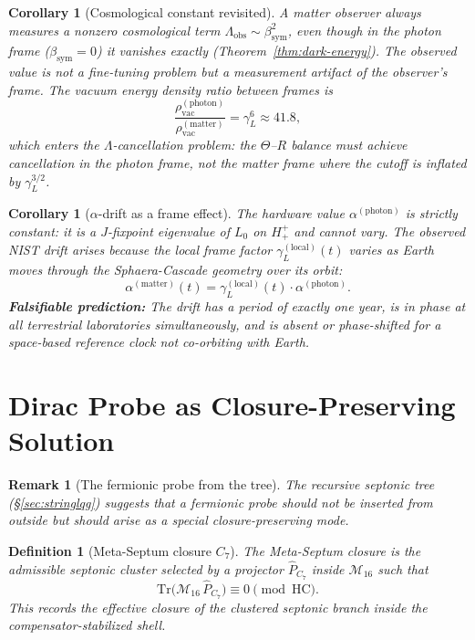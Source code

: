 \documentclass[12pt,a4paper]{article}
\newtheorem{corollary}[theorem]{Corollary}
\newtheorem{definition}[theorem]{Definition}
\newtheorem*{remark}{Remark}
\newcommand{\bsym}{\beta_{\mathrm{sym}}}
\newcommand{\gL}{\gamma_L}
\newcommand{\Hplusplus}{H^+_+}
\begin{document}
\begin{corollary}[Cosmological constant revisited]
A matter observer always measures a nonzero cosmological term
$\Lambda_{\mathrm{obs}}\sim\bsym^2$, even though in the photon frame
($\bsym=0$) it vanishes exactly
(Theorem~\ref{thm:dark-energy}).
The observed value is not a fine-tuning problem but a measurement
artifact of the observer's frame.
The vacuum energy density ratio between frames is
\[
  \frac{\rho_{\mathrm{vac}}^{(\mathrm{photon})}}
       {\rho_{\mathrm{vac}}^{(\mathrm{matter})}}
  = \gL^6\approx 41.8,
\]
which enters the $\Lambda$-cancellation problem: the $\Theta$--$R$
balance must achieve cancellation in the \emph{photon} frame, not the
matter frame where the cutoff is inflated by $\gL^{3/2}$.
\end{corollary}

\begin{corollary}[$\alpha$-drift as a frame effect]
The hardware value $\alpha^{(\mathrm{photon})}$ is strictly constant:
it is a $J$-fixpoint eigenvalue of $L_0$ on $\Hplusplus$ and cannot vary.
The observed NIST drift arises because the local frame factor
$\gL^{(\mathrm{local})}(t)$ varies as Earth moves through the
Sphaera-Cascade geometry over its orbit:
\[
  \alpha^{(\mathrm{matter})}(t)
  = \gL^{(\mathrm{local})}(t)\cdot\alpha^{(\mathrm{photon})}.
\]
\textbf{Falsifiable prediction:} The drift has a period of exactly one
year, is in phase at all terrestrial laboratories simultaneously, and is
absent or phase-shifted for a space-based reference clock not co-orbiting
with Earth.
\end{corollary}


\section{Dirac Probe as Closure-Preserving Solution}
\label{sec:dirac-probe}

\begin{remark}[The fermionic probe from the tree]
The recursive septonic tree (§\ref{sec:stringlqg}) suggests that
a fermionic probe should not be inserted from outside but should arise
as a special closure-preserving mode.
\end{remark}

\begin{definition}[Meta-Septum closure $C_7$]
The \emph{Meta-Septum closure} is the admissible septonic cluster
selected by a projector $\hat P_{C_7}$ inside $\mathcal{M}_{16}$ such
that
\[
  \mathrm{Tr}\!\bigl(\mathcal{M}_{16}\,\hat P_{C_7}\bigr)
  \equiv 0\pmod{\mathrm{HC}}.
\]
This records the effective closure of the clustered septonic branch
inside the compensator-stabilized shell.
\end{definition}
\end{document}
